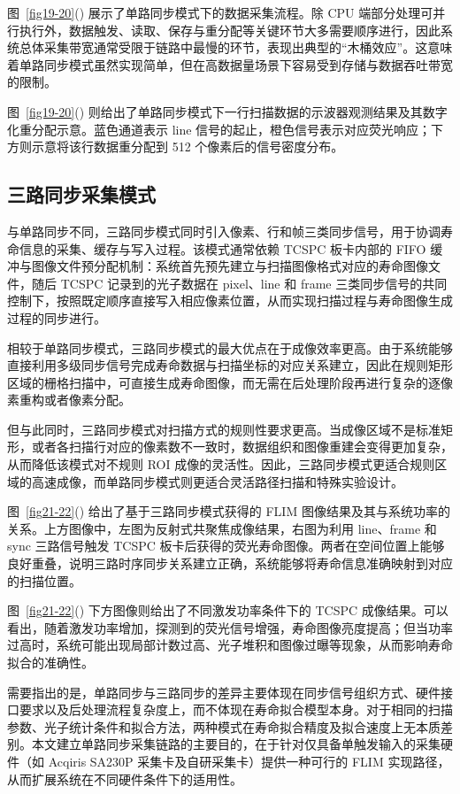 图~\ref{fig19-20}() 展示了单路同步模式下的数据采集流程。除 CPU 端部分处理可并行执行外，数据触发、读取、保存与重分配等关键环节大多需要顺序进行，因此系统总体采集带宽通常受限于链路中最慢的环节，表现出典型的``木桶效应''。这意味着单路同步模式虽然实现简单，但在高数据量场景下容易受到存储与数据吞吐带宽的限制。

图~\ref{fig19-20}() 则给出了单路同步模式下一行扫描数据的示波器观测结果及其数字化重分配示意。蓝色通道表示 line 信号的起止，橙色信号表示对应荧光响应；下方则示意将该行数据重分配到 512 个像素后的信号密度分布。




\subsection{三路同步采集模式}\label{5.3.3}

与单路同步不同，三路同步模式同时引入像素、行和帧三类同步信号，用于协调寿命信息的采集、缓存与写入过程。该模式通常依赖 TCSPC 板卡内部的 FIFO 缓冲与图像文件预分配机制：系统首先预先建立与扫描图像格式对应的寿命图像文件，随后 TCSPC 记录到的光子数据在 pixel、line 和 frame 三类同步信号的共同控制下，按照既定顺序直接写入相应像素位置，从而实现扫描过程与寿命图像生成过程的同步进行。

相较于单路同步模式，三路同步模式的最大优点在于成像效率更高。由于系统能够直接利用多级同步信号完成寿命数据与扫描坐标的对应关系建立，因此在规则矩形区域的栅格扫描中，可直接生成寿命图像，而无需在后处理阶段再进行复杂的逐像素重构或者像素分配。


但与此同时，三路同步模式对扫描方式的规则性要求更高。当成像区域不是标准矩形，或者各扫描行对应的像素数不一致时，数据组织和图像重建会变得更加复杂，从而降低该模式对不规则 ROI 成像的灵活性。因此，三路同步模式更适合规则区域的高速成像，而单路同步模式则更适合灵活路径扫描和特殊实验设计。

图~\ref{fig21-22}() 给出了基于三路同步模式获得的 FLIM 图像结果及其与系统功率的关系。上方图像中，左图为反射式共聚焦成像结果，右图为利用 line、frame 和 sync 三路信号触发 TCSPC 板卡后获得的荧光寿命图像。两者在空间位置上能够良好重叠，说明三路时序同步关系建立正确，系统能够将寿命信息准确映射到对应的扫描位置。

图~\ref{fig21-22}() 下方图像则给出了不同激发功率条件下的 TCSPC 成像结果。可以看出，随着激发功率增加，探测到的荧光信号增强，寿命图像亮度提高；但当功率过高时，系统可能出现局部计数过高、光子堆积和图像过曝等现象，从而影响寿命拟合的准确性。

需要指出的是，单路同步与三路同步的差异主要体现在同步信号组织方式、硬件接口要求以及后处理流程复杂度上，而不体现在寿命拟合模型本身。对于相同的扫描参数、光子统计条件和拟合方法，两种模式在寿命拟合精度及拟合速度上无本质差别。本文建立单路同步采集链路的主要目的，在于针对仅具备单触发输入的采集硬件（如 Acqiris SA230P 采集卡及自研采集卡）提供一种可行的 FLIM 实现路径，从而扩展系统在不同硬件条件下的适用性。


